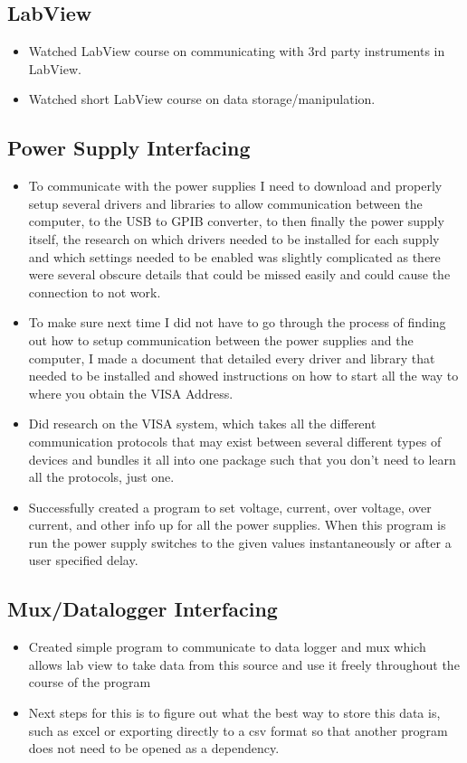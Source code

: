 \documentclass{article}
\begin{document}
\subsection*{LabView}
\begin{itemize}
    \item Watched LabView course on communicating with 3rd party instruments in LabView.
    \item Watched short LabView course on data storage/manipulation.
\end{itemize}
\subsection*{Power Supply Interfacing}
\begin{itemize}
    \item To communicate with the power supplies I  need to download and properly setup several drivers and libraries to allow communication between the computer, to the USB to GPIB converter, to then finally the power supply itself, the research on which drivers needed to be installed for each supply and which settings needed to be enabled was slightly complicated as there were several obscure details that could be missed easily and could cause the connection to not work.
    \item To make sure next time I did not have to go through the process of finding out how to setup communication between the power supplies and the computer, I made a document that detailed every driver and library that needed to be installed and showed instructions on how to start all the way to where you obtain the VISA Address.
    \item Did research on the VISA system, which takes all the different communication protocols that may exist between several different types of devices and bundles it all into one package such that you don't need to learn all the protocols, just one.
    \item Successfully created a program to set voltage, current, over voltage, over current, and other info up for all the power supplies. When this program is run the power supply switches to the given values instantaneously or after a user specified delay.
\end{itemize}
\subsection*{Mux/Datalogger Interfacing}
\begin{itemize}
    \item Created simple program to communicate to data logger and mux which allows lab view to take data from this source and use it freely throughout the course of the program
    \item Next steps for this is to figure out what the best way to store this data is, such as excel or exporting directly to a csv format so that another program does not need to be opened as a dependency.
\end{itemize}
\end{document}
